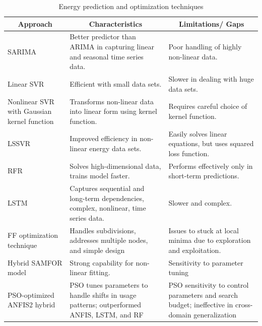 \documentclass[journal]{IEEEtran}
\begin{document}
\begin{table}
\centering
\caption{Energy prediction and optimization techniques} \label{tab:combined_comparison}
\begin{tabular}{|p{4.5cm}|p{5.2cm}|p{5.2cm}|}
\hline
\multicolumn{1}{c|}{\textbf{Approach}} & \multicolumn{1}{c|}{\textbf{Characteristics}} & \multicolumn{1}{c|}{\textbf{Limitations/ Gaps}} \\ \hline

SARIMA \cite{Ref40} & Better predictor than ARIMA in capturing linear and seasonal time series data. & Poor handling of highly non-linear data. \\ \hline

Linear SVR \cite{Ref44} & Efficient with small data sets. & Slower in dealing with huge data sets. \\ \hline

Nonlinear SVR with Gaussian kernel function \cite{Ref301} & Transforms non-linear data into linear form using kernel function. & Requires careful choice of kernel function. \\ \hline

LSSVR \cite{Ref47} & Improved efficiency in non-linear energy data sets. & Easily solves linear equations, but uses squared loss function. \\ \hline

RFR \cite{ref6} & Solves high-dimensional data, trains model faster. & Performs effectively only in short-term predictions. \\ \hline

LSTM \cite{Ref45} & Captures sequential and long-term dependencies, complex, nonlinear, time series data. & Slower and complex. \\ \hline

FF optimization technique \cite{Ref25} & Handles subdivisions, addresses multiple nodes, and simple design  & Issues to stuck at local minima due to exploration and exploitation. \\ \hline

Hybrid SAMFOR model \cite{ref4} & Strong capability for non-linear fitting. & Sensitivity to parameter tuning \\ \hline

PSO-optimized ANFIS2 hybrid \cite{RC59} & PSO tunes parameters to handle shifts in usage patterns; outperformed ANFIS, LSTM, and RF & PSO sensitivity to control parameters and search budget; ineffective in cross-domain generalization \\ \hline


\end{tabular}
\end{table}
\end{document}
